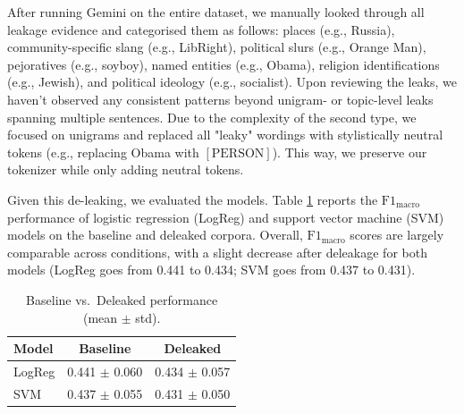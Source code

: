\documentclass[11pt]{article}
\begin{document}
After running Gemini on the entire dataset, we manually looked through all leakage evidence and categorised them as follows: places (e.g., Russia), community-specific slang (e.g., LibRight), political slurs (e.g., Orange Man), pejoratives (e.g., soyboy), named entities (e.g., Obama), religion identifications (e.g., Jewish), and political ideology (e.g., socialist). Upon reviewing the leaks, we haven't observed any consistent patterns beyond unigram- or topic-level leaks spanning multiple sentences. Due to the complexity of the second type, we focused on unigrams and replaced all "leaky" wordings with stylistically neutral tokens (e.g., replacing Obama with $[\text{PERSON}]$). This way, we preserve our tokenizer while only adding neutral tokens.

Given this de-leaking, we evaluated the models. Table \ref{tab:baseline_deleaked} reports the $\mathrm{F1}_{\text{macro}}$ performance of logistic regression (LogReg) and support vector machine (SVM) models on the baseline and deleaked corpora. Overall, $\mathrm{F1}_{\text{macro}}$ scores are largely comparable across conditions, with a slight decrease after deleakage for both models (LogReg goes from 0.441 to 0.434; SVM goes from 0.437 to 0.431). 
\begin{table}[t]
    \centering
    \caption{Baseline vs.\ Deleaked performance (mean $\pm$ std).}
    \label{tab:baseline_deleaked}
    \begin{tabular}{|l|c|c|}
    \hline
    \textbf{Model} & \textbf{Baseline} & \textbf{Deleaked} \\
    \hline
    LogReg & 0.441 $\pm$ 0.060 & 0.434 $\pm$ 0.057 \\
    \hline
    SVM    & 0.437 $\pm$ 0.055 & 0.431 $\pm$ 0.050 \\
    \hline
\end{tabular}
\end{table}
\end{document}

